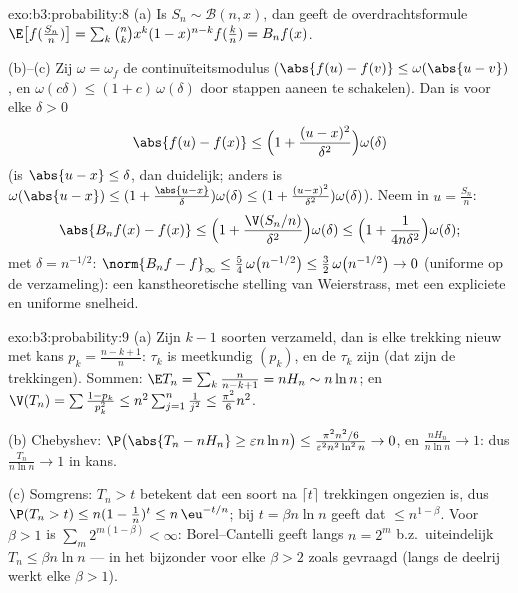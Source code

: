\begin{solution}{exo:b3:probability:8}
(a) Is $S_n \sim \mathcal B(n, x)$, dan geeft de
overdrachtsformule $\E\bigl[f(\frac{S_n}n)\bigr] =
\sum_k\binom nkx^k(1-x)^{n-k}f(\frac kn) = B_nf(x)$.

(b)--(c) Zij $\omega = \omega_f$ de continuïteitsmodulus
($\abs{f(u) - f(v)} \leq \omega(\abs{u - v})$, en $\omega(c
\delta) \leq (1 + c)\,\omega(\delta)$ door stappen aaneen te
schakelen). Dan is voor elke $\delta > 0$
\[
\abs{f(u) - f(x)} \leq \Bigl(1 + \frac{(u -
x)^2}{\delta^2}\Bigr)\omega(\delta)
\]
(is $\abs{u - x} \leq \delta$, dan duidelijk; anders is
$\omega(\abs{u-x}) \leq (1 + \frac{\abs{u-x}}\delta)
\omega(\delta) \leq (1 + \frac{(u-x)^2}{\delta^2})
\omega(\delta)$). Neem  in $u = \frac{S_n}n$:
\[
\abs{B_nf(x) - f(x)} \leq
\Bigl(1 + \frac{\V(S_n/n)}{\delta^2}\Bigr)\omega(\delta)
\leq \Bigl(1 + \frac{1}{4n\delta^2}\Bigr)\omega(\delta) ;
\]
met $\delta = n^{-1/2}$: $\norm{B_nf - f}_\infty \leq
\frac54\,\omega\bigl(n^{-1/2}\bigr) \leq
\frac32\,\omega\bigl(n^{-1/2}\bigr) \to 0$ (uniforme
 op de  verzameling): een kanstheoretische
stelling van Weierstrass, met een expliciete en uniforme
snelheid.
\end{solution}

\begin{solution}{exo:b3:probability:9}
(a) Zijn $k - 1$ soorten verzameld, dan is elke trekking nieuw
met kans $p_k = \frac{n-k+1}n$: $\tau_k$ is meetkundig $(p_k)$,
en de $\tau_k$ zijn  (dat zijn de trekkingen).
Sommen: $\E T_n = \sum_k\frac n{n-k+1} = nH_n \sim n\ln n$; en
$\V(T_n) = \sum\frac{1 - p_k}{p_k^2} \leq
n^2\sum_{j=1}^n\frac1{j^2} \leq \frac{\pi^2}6n^2$.

(b) Chebyshev: $\P\bigl(\abs{T_n - nH_n} \geq \varepsilon n\ln
n\bigr) \leq \frac{\pi^2n^2/6}{\varepsilon^2n^2\ln^2n} \to 0$, en
$\frac{nH_n}{n\ln n} \to 1$: dus $\frac{T_n}{n\ln n} \to 1$ in
kans.

(c) Somgrens: $T_n > t$ betekent dat een soort na $\lceil
t\rceil$ trekkingen ongezien is, dus $\P(T_n > t) \leq n(1 -
\frac1n)^{t} \leq n\,\eu^{-t/n}$; bij $t = \beta n\ln n$ geeft
dat $\leq n^{1 - \beta}$. Voor $\beta > 1$ is $\sum_m
2^{m(1-\beta)} < \infty$: Borel--Cantelli geeft langs $n = 2^m$
b.z.\ uiteindelijk $T_n \leq \beta n\ln n$ --- in het bijzonder
voor elke $\beta > 2$ zoals gevraagd (langs de deelrij werkt elke
$\beta > 1$).
\end{solution}

